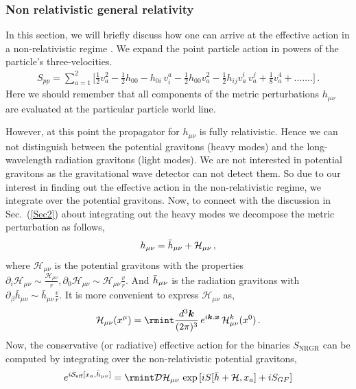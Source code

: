 \subsubsection*{Non relativistic general relativity}
In this section, we will briefly discuss how one can arrive at the effective action in a non-relativistic regime \cite{Goldberger:2004jt,Levi:2018nxp,Porto:2016pyg}. We expand the point particle action in powers of the particle's three-velocities.
\begin{eqnarray}
    S_{pp}=\sum_{a=1}^2\Big[\frac{1}{2}v_a^2-\frac{1}{2}h_{00}-h_{0i}\,v^a_{i}-\frac{1}{2}h_{00}v_{a}^2-\frac{1}{2}h_{ij}v^{i}_a\,v^{j}_a+\frac{1}{8}v_a^4+.......\Big]\,.
\end{eqnarray}
Here we should remember that all components of the metric perturbations $h_{\mu\nu}$ are evaluated at the particular particle world line.\par 
However, at this point the propagator for $h_{\mu\nu}$ is fully relativistic. Hence we can not distinguish between the potential gravitons (heavy modes) and the long-wavelength radiation gravitons (light modes). We are not interested in potential gravitons as the gravitational wave detector can not detect them. So due to our interest in finding out the effective action in the non-relativistic regime, we integrate over the potential gravitons. Now, to connect with the discussion in Sec.~(\ref{Sec2}) about integrating out the heavy modes we decompose the metric perturbation as follows,
\begin{eqnarray}
    h_{\mu\nu}=\Bar{h}_{\mu\nu}+
\mathcal{H}_{\mu\nu}\,,\label{3.6n}
\end{eqnarray}
where $\mathcal{H}_{\mu\nu}$ is the potential gravitons with the properties $\partial_{i}\mathcal{H}_{\mu\nu}\sim\frac{\mathcal{H}_{\mu\nu}}{r},\partial_{0}\mathcal{H}_{\mu\nu}\sim{\mathcal{H}_{\mu\nu}}\frac{v}{r}$. And $\Bar{h}_{\mu\nu}$ is the radiation gravitons with $\partial_{\beta}\bar{h}_{\mu\nu}\sim{\bar{h}_{\mu\nu}}\frac{v}{r}$. It is more convenient to express $\mathcal{H}_{\mu\nu}$ as,
\begin{eqnarray}
    \mathcal{H}_{\mu\nu}(x^\mu)=\rmint\frac{d^3\boldsymbol{k}}{(2\pi)^3}\,e^{i\boldsymbol{k}.\boldsymbol{x}}\,\mathcal{H}^{k}_{\mu\nu}(x^0)\,.
\end{eqnarray}
Now, the conservative (or radiative) effective action for the binaries $S_{\text{NRGR}}$ can be computed by integrating over the non-relativistic potential gravitons,
\begin{eqnarray}
    e^{i\mathcal{S}_{\text{eff}}[x_a,\Bar{h}_{\mu\nu}]}=\rmint \mathcal{D}\mathcal{H}_{\mu\nu}\,\exp{[iS[\Bar{h}+\mathcal{H},x_a]+iS_{GF}]}\label{2.8}
\end{eqnarray}
